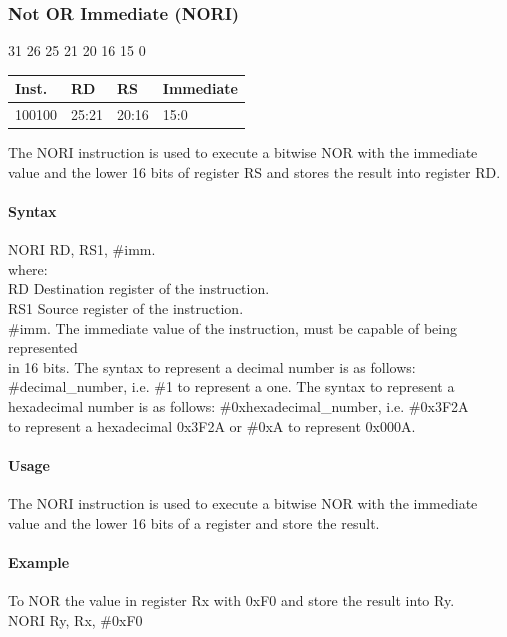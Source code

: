 \documentclass[12pt]{article}
\newcommand{\iTypeInstruction}[6]
{%
    \hspace{1.6cm}31 \hspace{1.15cm}26 \hspace{.05cm}25 \hspace{.8cm}21 \hspace{.05cm}20 \hspace{.8cm}16 \hspace{.05cm}15 \hspace{6.4cm}0
    \vspace{-.25cm}
    \begin{center}
        \begin{tabular}{ |p{1.8cm}|p{1.5cm}|p{1.5cm}|p{6.8cm}| }
            \hline
            \textbf{Inst.} & \textbf{RD} &  \textbf{RS} & \textbf{Immediate}\\
            \hline
            #1 & 25:21 & 20:16 &15:0\\
            \hline
        \end{tabular}
    \end{center}
    
    \noindent
    #2
    
    \paragraph{Syntax}
    \begin{flushleft}
    #3 RD, RS1, \#imm.\\
    \vspace{1em}        %
    where:\\
    \vspace{1em}
    RD  \hspace{3.6em} Destination register of the instruction.\\
    \vspace{1em}
    RS1  \hspace{3.35em} Source register of the instruction.\\
    \vspace{1em}
    \#imm.  \hspace{1.8em} The immediate value of the instruction, must be capable of being represented\\             \hspace{5.4em} in 16 bits. The syntax to represent a decimal number is as follows:\\
            \hspace{5.4em} \#decimal\_number, i.e. \#1 to represent a one. The syntax to represent a\\
            \hspace{5.4em} hexadecimal number is as follows: \#0xhexadecimal\_number, i.e. \#0x3F2A \\
            \hspace{5.4em} to represent a hexadecimal 0x3F2A or \#0xA to represent 0x000A.\\
    \end{flushleft}
    
    \paragraph{Usage}
    \begin{flushleft}
    #4\\
    \end{flushleft}
    \paragraph{Example}
    \begin{flushleft}
    #5\\
    \vspace{1em}
    #6
    \end{flushleft}}
\begin{document}

    \newpage
    \subsubsection{Not OR Immediate (NORI)}
    
    \iTypeInstruction
    {100100}
    {The NORI instruction is used to execute a bitwise NOR with the immediate value and the lower 16 bits of register RS and stores the result into register RD.}
    {NORI}
    {The NORI instruction is used to execute a bitwise NOR with the immediate value and the lower 16 bits of a register and store the result.}
    {To NOR the value in register Rx with 0xF0 and store the result into Ry.}
    {NORI Ry, Rx, \#0xF0}
    
    
    
\end{document}
